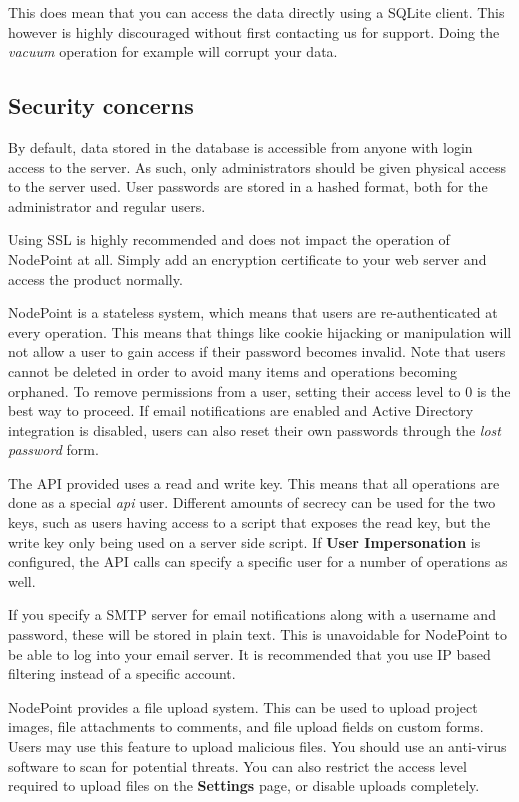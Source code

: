 \documentclass[11pt]{article}
\begin{document}
This does mean that you can access the data directly using a SQLite client. This however is highly discouraged without first contacting us for support. Doing the \textit{vacuum} operation for example will corrupt your data.

\subsection{Security concerns}
By default, data stored in the database is accessible from anyone with login access to the server. As such, only administrators should be given physical access to the server used. User passwords are stored in a hashed format, both for the administrator and regular users.

Using SSL is highly recommended and does not impact the operation of NodePoint at all. Simply add an encryption certificate to your web server and access the product normally.

NodePoint is a stateless system, which means that users are re-authenticated at every operation. This means that things like cookie hijacking or manipulation will not allow a user to gain access if their password becomes invalid. Note that users cannot be deleted in order to avoid many items and operations becoming orphaned. To remove permissions from a user, setting their access level to 0 is the best way to proceed. If email notifications are enabled and Active Directory integration is disabled, users can also reset their own passwords through the \textit{lost password} form.

The API provided uses a read and write key. This means that all operations are done as a special \textit{api} user. Different amounts of secrecy can be used for the two keys, such as users having access to a script that exposes the read key, but the write key only being used on a server side script. If \textbf{User Impersonation} is configured, the API calls can specify a specific user for a number of operations as well.

If you specify a SMTP server for email notifications along with a username and password, these will be stored in plain text. This is unavoidable for NodePoint to be able to log into your email server. It is recommended that you use IP based filtering instead of a specific account.

NodePoint provides a file upload system. This can be used to upload project images, file attachments to comments, and file upload fields on custom forms. Users may use this feature to upload malicious files. You should use an anti-virus software to scan for potential threats. You can also restrict the access level required to upload files on the \textbf{Settings} page, or disable uploads completely.
\end{document}

